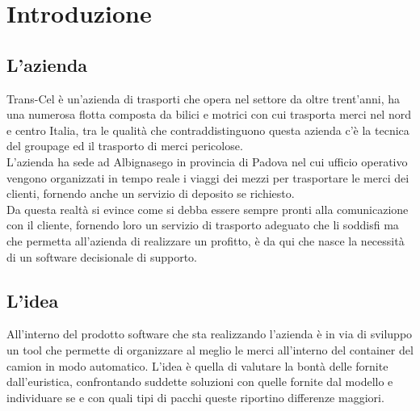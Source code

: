 
\chapter{Introduzione}
\section{L'azienda}
Trans-Cel è un'azienda di trasporti che opera nel settore da oltre trent'anni, ha una numerosa flotta composta da bilici e motrici con cui trasporta merci nel nord e centro Italia, tra le qualità che contraddistinguono questa azienda c'è la tecnica del groupage ed il trasporto di merci pericolose.\\
L'azienda ha sede ad Albignasego in provincia di Padova nel cui ufficio operativo vengono organizzati in tempo reale i viaggi dei mezzi per trasportare le merci dei clienti, fornendo anche un servizio di deposito se richiesto.\\
Da questa realtà si evince come si debba essere sempre pronti alla comunicazione con il cliente, fornendo loro un servizio di trasporto adeguato che li soddisfi ma che permetta all'azienda di realizzare un profitto, è da qui che nasce la necessità di un software decisionale di supporto.
\newpage
\section{L'idea}
All'interno del prodotto software che sta realizzando l'azienda è in via di sviluppo un tool che permette di organizzare al meglio le merci all'interno del container del camion in modo automatico. L'idea è quella di valutare la bontà delle  fornite dall'euristica, confrontando suddette soluzioni con quelle fornite dal modello e individuare se e con quali tipi di pacchi queste riportino differenze maggiori.

